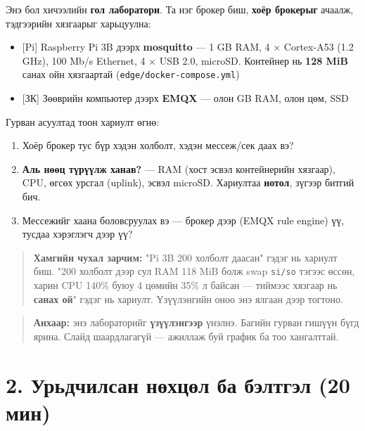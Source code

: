 Энэ бол хичээлийн \textbf{гол лаборатори}. Та нэг брокер биш, \textbf{хоёр брокерыг} ачаалж, тэдгээрийн хязгаарыг харьцуулна:

\begin{itemize}
\tightlist
\item
  {[}Pi{]} Raspberry Pi 3B дээрх \textbf{mosquitto} --- 1 GB RAM, 4 × Cortex-A53 (1.2 GHz), 100 Mb/s Ethernet, 4 × USB 2.0, microSD. Контейнер нь \textbf{128 MiB} санах ойн хязгаартай (\texttt{edge/\allowbreak{}docker-compose.\allowbreak{}yml})
\item
  {[}ЗК{]} Зөөврийн компьютер дээрх \textbf{EMQX} --- олон GB RAM, олон цөм, SSD
\end{itemize}

Гурван асуултад тоон хариулт өгнө:

\begin{enumerate}
\def\labelenumi{\arabic{enumi}.}
\tightlist
\item
  Хоёр брокер тус бүр хэдэн холболт, хэдэн мессеж/сек даах вэ?
\item
  \textbf{Аль нөөц түрүүлж ханав?} --- RAM (хост эсвэл контейнерийн хязгаар), CPU, өгсөх урсгал (uplink), эсвэл microSD. Хариултаа \textbf{нотол}, зүгээр битгий бич.
\item
  Мессежийг хаана боловсруулах вэ --- брокер дээр (EMQX rule engine) үү, тусдаа хэрэглэгч дээр үү?
\end{enumerate}

\begin{quote}
\textbf{Хамгийн чухал зарчим:} "Pi 3B 200 холболт даасан" гэдэг нь хариулт биш. "200 холболт дээр сул RAM 118 MiB болж swap \texttt{si/so} тэгээс өссөн, харин CPU 140\% буюу 4 цөмийн 35\% л байсан --- тиймээс хязгаар нь \textbf{санах ой}" гэдэг нь хариулт. Үзүүлэнгийн оноо энэ ялгаан дээр тогтоно.
\end{quote}

\begin{quote}
\textbf{Анхаар:} энэ лабораторийг \textbf{үзүүлэнгээр} үнэлнэ. Багийн гурван гишүүн бүгд ярина. Слайд шаардлагагүй --- ажиллаж буй график ба тоо хангалттай.
\end{quote}

\hypertarget{ux443ux440ux44cux434ux447ux438ux43bux441ux430ux43d-ux43dux4e9ux445ux446ux4e9ux43b-ux431ux430-ux431ux44dux43bux442ux433ux44dux43b-20-ux43cux438ux43d}{%
\section{2. Урьдчилсан нөхцөл ба бэлтгэл (20 мин)}\label{ux443ux440ux44cux434ux447ux438ux43bux441ux430ux43d-ux43dux4e9ux445ux446ux4e9ux43b-ux431ux430-ux431ux44dux43bux442ux433ux44dux43b-20-ux43cux438ux43d}}

